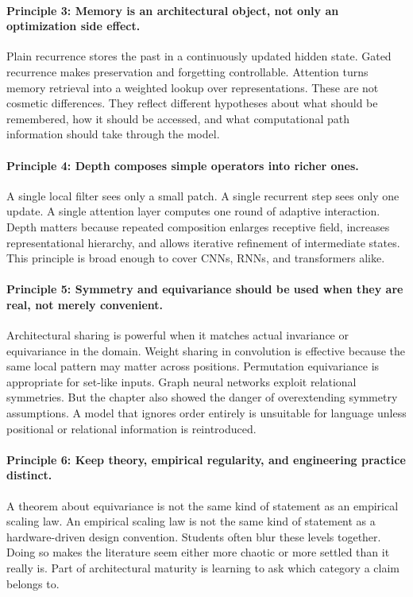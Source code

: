 \paragraph{Principle 3: Memory is an architectural object, not only an optimization side effect.}
Plain recurrence stores the past in a continuously updated hidden state.
Gated recurrence makes preservation and forgetting controllable.
Attention turns memory retrieval into a weighted lookup over representations.
These are not cosmetic differences.
They reflect different hypotheses about what should be remembered, how it should be accessed, and what computational path information should take through the model.

\paragraph{Principle 4: Depth composes simple operators into richer ones.}
A single local filter sees only a small patch.
A single recurrent step sees only one update.
A single attention layer computes one round of adaptive interaction.
Depth matters because repeated composition enlarges receptive field, increases representational hierarchy, and allows iterative refinement of intermediate states.
This principle is broad enough to cover CNNs, RNNs, and transformers alike.

\paragraph{Principle 5: Symmetry and equivariance should be used when they are real, not merely convenient.}
Architectural sharing is powerful when it matches actual invariance or equivariance in the domain.
Weight sharing in convolution is effective because the same local pattern may matter across positions.
Permutation equivariance is appropriate for set-like inputs.
Graph neural networks exploit relational symmetries.
But the chapter also showed the danger of overextending symmetry assumptions.
A model that ignores order entirely is unsuitable for language unless positional or relational information is reintroduced.

\paragraph{Principle 6: Keep theory, empirical regularity, and engineering practice distinct.}
A theorem about equivariance is not the same kind of statement as an empirical scaling law.
An empirical scaling law is not the same kind of statement as a hardware-driven design convention.
Students often blur these levels together.
Doing so makes the literature seem either more chaotic or more settled than it really is.
Part of architectural maturity is learning to ask which category a claim belongs to.

